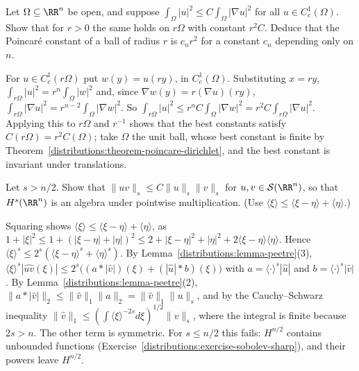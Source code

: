 \begin{exercise}\label{distributions:exercise-poincare-scaling}
Let $\Omega \subseteq \RR^n$ be open, and suppose $\int_\Omega|u|^2 \leq C\int_\Omega|\nabla u|^2$ for all $u \in C^1_c(\Omega)$. Show that for $r > 0$ the same holds on $r\Omega$ with constant $r^2C$. Deduce
that the Poincar\'e constant of a ball of radius $r$ is $c_nr^2$ for a constant $c_n$ depending only on $n$.
\end{exercise}

\begin{solution}
For $u \in C^1_c(r\Omega)$ put $w(y) = u(ry)$, in $C^1_c(\Omega)$. Substituting $x = ry$, $\int_{r\Omega}|u|^2 = r^n\int_\Omega|w|^2$ and, since $\nabla w(y) = r(\nabla u)(ry)$,
$\int_{r\Omega}|\nabla u|^2 = r^{n-2}\int_\Omega|\nabla w|^2$. So $\int_{r\Omega}|u|^2 \leq r^nC\int_\Omega|\nabla w|^2 = r^2C\int_{r\Omega}|\nabla u|^2$. Applying this to $r\Omega$ and $r^{-1}$ shows that the best constants
satisfy $C(r\Omega) = r^2C(\Omega)$; take $\Omega$ the unit ball, whose best constant is finite by Theorem~\ref{distributions:theorem-poincare-dirichlet}, and the best constant is invariant under translations.
\end{solution}

\begin{exercise}\label{distributions:exercise-sobolev-algebra}
Let $s > n/2$. Show that $\|uv\|_s \leq C\|u\|_s\|v\|_s$ for $u, v \in \mathcal{S}(\RR^n)$, so that $H^s(\RR^n)$ is an algebra under pointwise multiplication. (Use $\langle\xi\rangle \leq \langle\xi - \eta\rangle + \langle\eta\rangle$.)
\end{exercise}

\begin{solution}
Squaring shows $\langle\xi\rangle \leq \langle\xi - \eta\rangle + \langle\eta\rangle$, as $1 + |\xi|^2 \leq 1 + (|\xi - \eta| + |\eta|)^2 \leq 2 + |\xi - \eta|^2 + |\eta|^2 + 2\langle\xi - \eta\rangle\langle\eta\rangle$. Hence
$\langle\xi\rangle^s \leq 2^s(\langle\xi - \eta\rangle^s + \langle\eta\rangle^s)$. By Lemma~\ref{distributions:lemma-peetre}(3), $\langle\xi\rangle^s|\widehat{uv}(\xi)| \leq 2^s\bigl((a * |\hat v|)(\xi) + (|\hat u| * b)(\xi)\bigr)$ with
$a = \langle\cdot\rangle^s|\hat u|$ and $b = \langle\cdot\rangle^s|\hat v|$. By Lemma~\ref{distributions:lemma-peetre}(2), $\|a * |\hat v|\|_2 \leq \|\hat v\|_1\|a\|_2 = \|\hat v\|_1\|u\|_s$, and by the Cauchy--Schwarz inequality
$\|\hat v\|_1 \leq (\int\langle\xi\rangle^{-2s}d\xi)^{1/2}\|v\|_s$, where the integral is finite because $2s > n$. The other term is symmetric. For $s \leq n/2$ this fails: $H^{n/2}$ contains unbounded functions
(Exercise~\ref{distributions:exercise-sobolev-sharp}), and their powers leave $H^{n/2}$.
\end{solution}

